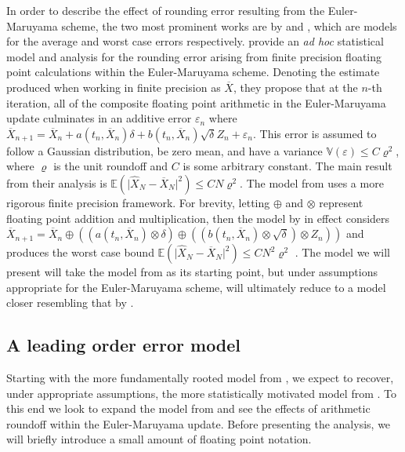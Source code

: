 \documentclass[manuscript,review]{acmart}
\begin{document}
In order to describe the effect of rounding error resulting from the Euler-Maruyama scheme, the two most prominent works are by \citet{arciniega2003rounding} and \citet{omland2016mixed}, which are models for the average and worst case errors respectively. \citet{arciniega2003rounding} provide an \textit{ad hoc} statistical model and analysis for the rounding error arising from finite precision floating point calculations within the Euler-Maruyama scheme. Denoting the estimate produced when working in finite precision as $ \overline{X} $, they propose that at the $ n $-th iteration, all of the composite floating point arithmetic in the Euler-Maruyama update culminates in an additive error $ \varepsilon_n $ where
$ \overline{X}_{n+1} = \overline{X}_n + a(t_n, \overline{X}_n) \delta + b(t_n, \overline{X}_n)\sqrt{\delta} Z_n + \varepsilon_n $.
This error is assumed to follow a Gaussian distribution, be zero mean, and have a variance $ \mathbb{V}(\varepsilon) \leq C \varrho^2 $, where $ \varrho $ is the unit roundoff and $ C $ is some arbitrary constant. The main result from their analysis \citep[theorem~2.2]{arciniega2003rounding} is $ \mathbb{E}(\lvert \widehat{X}_N - \overline{X}_N \rvert^2) \leq  CN\varrho^2 $. The model from \citet{omland2016mixed} uses a more rigorous finite precision framework. For brevity, letting $ \oplus $ and $ \otimes $ represent floating point addition and multiplication, then the model by \citet{omland2016mixed} in effect considers $ \overline{X}_{n+1} = \overline{X}_n \oplus ((a(t_n, \overline{X}_n) \otimes \delta) \oplus ((b(t_n, \overline{X}_n)\otimes \sqrt{\delta})\otimes Z_n)) $ and produces the worst case bound $ \mathbb{E}(\lvert \widehat{X}_N - \overline{X}_N \rvert^2) \leq  CN^2\varrho^2 $ \citep[theorem~4.8]{omland2016mixed}. The model we will present will take the model from \citet{omland2016mixed} as its starting point, but under assumptions appropriate for the Euler-Maruyama scheme, will ultimately reduce to a model closer resembling that by \citet{arciniega2003rounding}.

\subsection{A leading order error model}
\label{sec:a_leading_order_error_model}

Starting with the more fundamentally rooted model from \citet{omland2016mixed}, we expect to recover, under appropriate assumptions, the more statistically motivated model from \citet{arciniega2003rounding}. To this end we look to expand the model from \citet{omland2016mixed} and see the effects of arithmetic roundoff within the Euler-Maruyama update. Before presenting the analysis, we will briefly introduce a small amount of floating point notation. 
\end{document}
